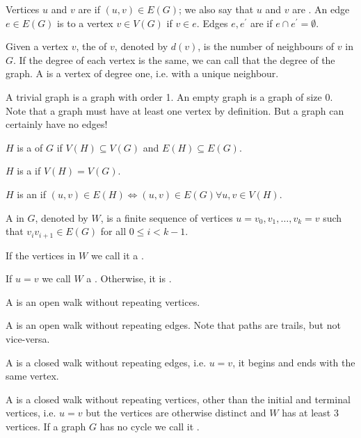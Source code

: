 Vertices $u$ and $v$ are  if $(u,v) \in E(G)$; we also say that $u$ and $v$ are . An edge $e \in E(G)$ is  to a vertex $v \in V(G)$ if $v \in e$. Edges $e, e^\prime$ are  if $e \cap e^\prime = \emptyset$.

Given a vertex $v$, the  of $v$, denoted by $d(v)$, is the number of neighbours of $v$ in $G$. If the degree of each vertex is the same, we can call that the degree of the graph. A  is a vertex of degree one, i.e. with a unique neighbour.

\begin{remark}
A trivial graph is a graph with order 1. An empty graph is a graph of size 0. 
Note that a graph must have at least one vertex by definition. But a graph can certainly have no edges!
\end{remark}

\begin{definition}[Subgraph]
$H$ is a  of $G$ if $V(H) \subseteq V(G)$ and $E(H) \subseteq E(G)$.
\end{definition}

$H$ is a  if $V(H)=V(G)$.

$H$ is an  if $(u,v) \in E(H) \iff (u,v) \in E(G) \forall u, v \in V(H)$.

\begin{definition}[Walk]
A  in $G$, denoted by $W$, is a finite sequence of vertices $u=v_0,v_1,\dots,v_k=v$ such that $v_i v_{i+1} \in E(G)$ for all $0 \le i < k-1$.
\end{definition}

If the vertices in $W$ we call it a .

If $u=v$ we call $W$ a . Otherwise, it is .

A  is an open walk without repeating vertices.

A  is an open walk without repeating edges. Note that paths are trails, but not vice-versa.

A  is a closed walk without repeating edges, i.e. $u=v$, it begins and ends with the same vertex.

A  is a closed walk without repeating vertices, other than the initial and terminal vertices, i.e. $u=v$ but the vertices are otherwise distinct and $W$ has at least 3 vertices. If a graph $G$ has no cycle we call it .

